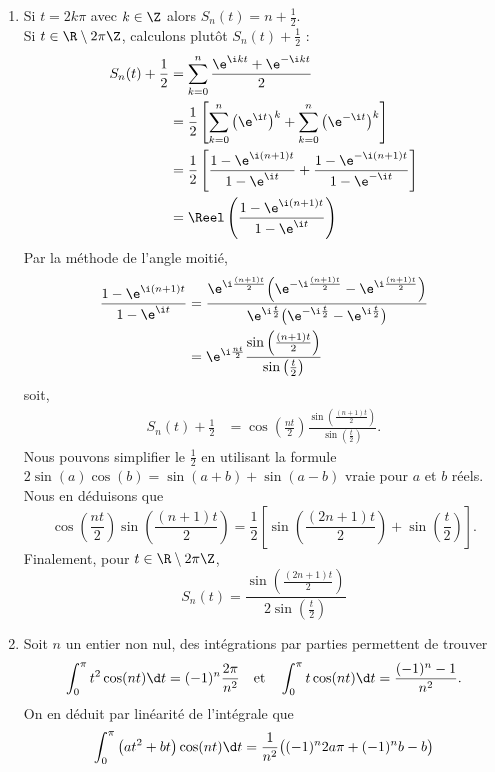 \begin{solution}
\begin{enumerate}
\item Si $t = 2k \pi$ avec $k \in \Z$ alors $S_n(t) = n + \frac{1}{2}$. \\
Si $t \in \R \setminus 2 \pi \Z$, calculons plutôt $S_n(t) + \frac{1}{2}$ :
    \begin{align*}
    S_n(t) + \frac{1}{2} &= \sum_{k=0}^n \frac{\e^{\i k t} + \e^{-\i k t}}{2} \\
    &= \frac{1}{2} \left[\sum_{k=0}^n \big(\e^{\i t}\big)^k + \sum_{k=0}^n \big(\e^{-\i t}\big)^k \right] \\
    &= \frac{1}{2} \left[ \frac{1 - \e^{\i (n+1)t}}{1 - \e^{\i t}} + \frac{1 - \e^{-\i (n+1)t}}{1 - \e^{-\i t}} \right] \\
    &= \Reel \left( \frac{1 - \e^{\i (n+1)t}}{1 - \e^{\i t}} \right)
\end{align*}
Par la méthode de l'angle moitié, 
\begin{align*}
    \frac{1 - \e^{\i (n+1)t}}{1 - \e^{\i t}} &= \frac{\e^{\i\frac{(n+1)t}{2}} \Big( \e^{-\i\frac{(n+1)t}{2}} - \e^{\i\frac{(n+1)t}{2}} \Big)}{\e^{\i\frac{t}{2}} \big( \e^{-\i\frac{t}{2}} - \e^{\i\frac{t}{2}} \big)} \\
    &= \e^{\i \frac{nt}{2}} \frac{\sin \left( \frac{(n+1)t}{2} \right)}{\sin \left( \frac{t}{2} \right)}
\end{align*}
soit, 
\begin{align*}
    S_n(t) + \frac{1}{2} &= \cos \left(\frac{nt}{2}\right) \frac{\sin \left( \frac{(n+1)t}{2} \right)}{\sin \left( \frac{t}{2} \right)}.
\end{align*}
Nous pouvons simplifier le $\frac{1}{2}$ en utilisant la formule $2 \sin(a) \cos(b) =\sin(a+b) + \sin(a-b)$ vraie pour $a$ et $b$ réels. Nous en déduisons que 
\[
\cos \left(\frac{nt}{2}\right) \sin \left( \frac{(n+1)t}{2} \right) = \frac{1}{2} \left[ \sin \left( \frac{(2n+1)t}{2} \right) + \sin \left( \frac{t}{2} \right) \right].
\]
Finalement, pour $t \in \R \setminus 2 \pi \Z$,
\[
S_n(t) = \frac{\sin \left( \frac{(2n+1)t}{2} \right)}{2 \sin \left( \frac{t}{2} \right)}
\]
\item Soit $n$ un entier non nul, des intégrations par parties permettent de trouver
\[
\int_0^\pi t^2 \cos(n t) \d t = (-1)^n\frac{2\pi}{n^2} \quad \text{et} \quad \int_0^\pi t \cos(n t) \d t = \frac{(-1)^n - 1}{n^2}.
\]
On en déduit par linéarité de l'intégrale que 
\[
\int_0^\pi \big(a t^2 + bt\big) \cos(nt) \d t = \frac{1}{n^2} \big( (-1)^n 2 a \pi + (-1)^n b - b \big)
\]
\end{enumerate}
\end{solution}

